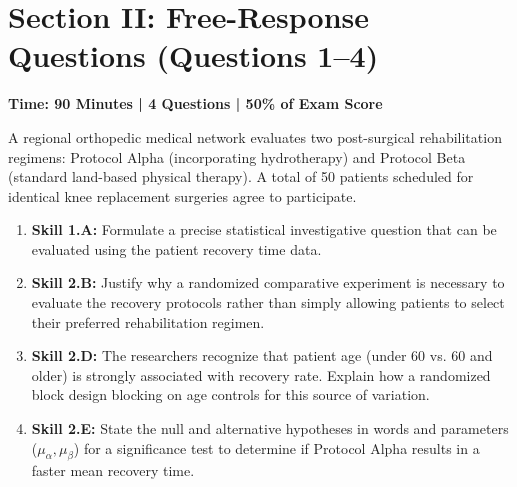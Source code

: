 \section{Section II: Free-Response Questions (Questions 1--4)}
\textbf{Time: 90 Minutes | 4 Questions | 50\% of Exam Score}

\begin{workbookbox}
A regional orthopedic medical network evaluates two post-surgical rehabilitation regimens: Protocol Alpha (incorporating hydrotherapy) and Protocol Beta (standard land-based physical therapy). A total of 50 patients scheduled for identical knee replacement surgeries agree to participate.
\begin{enumerate}[label=(\alph*)]
  \item \textbf{Skill 1.A:} Formulate a precise statistical investigative question that can be evaluated using the patient recovery time data.
  \item \textbf{Skill 2.B:} Justify why a randomized comparative experiment is necessary to evaluate the recovery protocols rather than simply allowing patients to select their preferred rehabilitation regimen.
  \item \textbf{Skill 2.D:} The researchers recognize that patient age (under 60 vs. 60 and older) is strongly associated with recovery rate. Explain how a randomized block design blocking on age controls for this source of variation.
  \item \textbf{Skill 2.E:} State the null and alternative hypotheses in words and parameters ($\mu_\alpha, \mu_\beta$) for a significance test to determine if Protocol Alpha results in a faster mean recovery time.
\end{enumerate}
\end{workbookbox}

